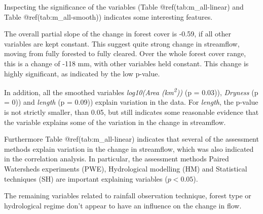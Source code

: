 \documentclass[]{elsarticle} %
\begin{document}
Inspecting the significance of the variables (Table @ref(tab:m\_all-linear) and Table @ref(tab:m\_all-smooth)) indicates some interesting features.

The overall partial slope of the change in forest cover is -0.59, if all other variables are kept constant. This suggest quite strong change in streamflow, moving from fully forested to fully cleared. Over the whole forest cover range, this is a change of -118 mm, with other variables held constant. This change is highly significant, as indicated by the low p-value.

In addition, all the smoothed variables \emph{log10(Area (km\textsuperscript{2}))} (p = 0.03)), \emph{Dryness} (p = 0)) and \emph{length} (p = 0.09)) explain variation in the data. For \emph{length}, the p-value is not strictly smaller, than 0.05, but still indicates some reasonable evidence that the variable explains some of the variation in the change in streamflow.

Furthermore Table @ref(tab:m\_all-linear) indicates that several of the assessment methods explain variation in the change in streamflow, which was also indicated in the correlation analysis. In particular, the assessment methods Paired Watersheds experiments (PWE), Hydrological modelling (HM) and Statistical techniques (SH) are important explaining variables (\(p < 0.05\)).

The remaining variables related to rainfall observation technique, forest type or hydrological regime don't appear to have an influence on the change in flow.
\end{document}
